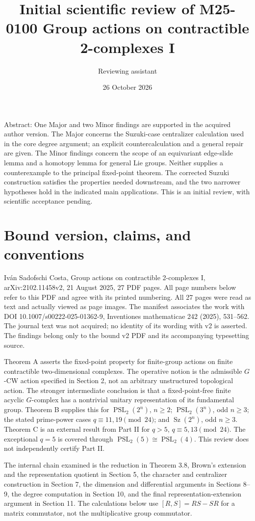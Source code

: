 \documentclass[10pt]{article}
\title{Initial scientific review of M25-0100
Group actions on contractible 2-complexes I}
\author{Reviewing assistant}
\date{26 October 2026}
\begin{document}
\maketitle
Abstract: One Major and two Minor findings are supported in the acquired author version. The Major concerns the Suzuki-case centralizer calculation used in the core degree argument; an explicit countercalculation and a general repair are given. The Minor findings concern the scope of an equivariant edge-slide lemma and a homotopy lemma for general Lie groups. Neither supplies a counterexample to the principal fixed-point theorem. The corrected Suzuki construction satisfies the properties needed downstream, and the two narrower hypotheses hold in the indicated main applications. This is an initial review, with scientific acceptance pending.\par
\section*{Bound version, claims, and conventions}
Iván Sadofschi Costa, Group actions on contractible 2-complexes I, arXiv:2102.11458v2, 21 August 2025, 27 PDF pages. All page numbers below refer to this PDF and agree with its printed numbering. All 27 pages were read as text and actually viewed as page images. The manifest associates the work with DOI 10.1007/s00222-025-01362-9, Inventiones mathematicae 242 (2025), 531–562. The journal text was not acquired; no identity of its wording with v2 is asserted. The findings belong only to the bound v2 PDF and its accompanying typesetting source.\par
Theorem A asserts the fixed-point property for finite-group actions on finite contractible two-dimensional complexes. The operative notion is the admissible \(G\)-CW action specified in Section 2, not an arbitrary unstructured topological action. The stronger intermediate conclusion is that a fixed-point-free finite acyclic \(G\)-complex has a nontrivial unitary representation of its fundamental group. Theorem B supplies this for \(\operatorname{PSL}_2(2^n)\), \(n\geq2\); \(\operatorname{PSL}_2(3^n)\), odd \(n\geq3\); the stated prime-power cases \(q\equiv11,19\pmod{24}\); and \(\operatorname{Sz}(2^n)\), odd \(n\geq3\). Theorem C is an external result from Part II for \(q>5\), \(q\equiv5,13\pmod{24}\). The exceptional \(q=5\) is covered through \(\operatorname{PSL}_2(5)\cong\operatorname{PSL}_2(4)\). This review does not independently certify Part II.\par
The internal chain examined is the reduction in Theorem 3.8, Brown’s extension and the representation quotient in Section 5, the character and centralizer construction in Section 7, the dimension and differential arguments in Sections 8–9, the degree computation in Section 10, and the final representation-extension argument in Section 11. The calculations below use \([R,S]=RS-SR\) for a matrix commutator, not the multiplicative group commutator.\par
\end{document}
